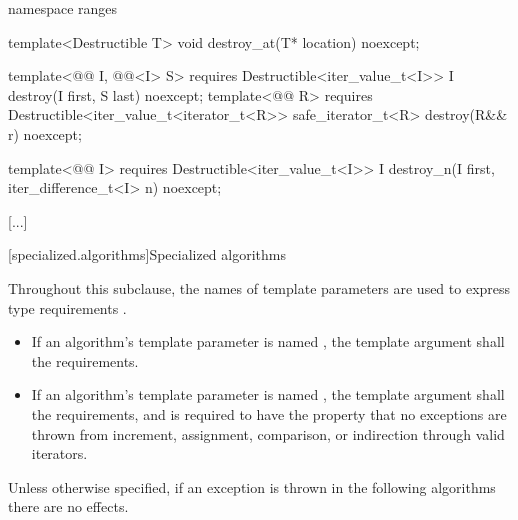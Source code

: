 \begin{addedblock}
\begin{codeblock}
  namespace ranges {
    template<Destructible T>
      void destroy_at(T* location) noexcept;

    template<@@ I, @@<I> S>
      requires Destructible<iter_value_t<I>>
        I destroy(I first, S last) noexcept;
    template<@@ R>
      requires Destructible<iter_value_t<iterator_t<R>>
        safe_iterator_t<R> destroy(R&& r) noexcept;

    template<@@ I>
      requires Destructible<iter_value_t<I>>
        I destroy_n(I first, iter_difference_t<I> n) noexcept;
  }
\end{codeblock}
\end{addedblock}
\begin{codeblock}

  [...]
}
\end{codeblock}

[...]

\setcounter{subsection}{10}
[specialized.algorithms]{Specialized algorithms}

\pnum
Throughout this subclause, the names of template parameters are used to
express type requirements .
\begin{itemize}
\item
If an algorithm's template parameter is named ,
the template argument shall  the
 requirements.
\item
If an algorithm's template parameter is named ,
the template argument shall  the
 requirements, and
is required to have the property that no exceptions are thrown
from increment, assignment, comparison, or indirection through valid iterators.
\end{itemize}

{\color{newclr}
\pnum
Unless otherwise specified,
if an exception is thrown in the following algorithms there are no effects.
} %

